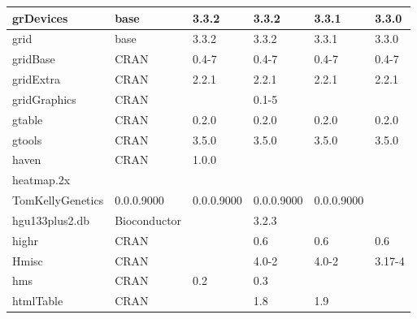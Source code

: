 \begin{longtable}{|llllll|}
grDevices                     & base                      & 3.3.2       & 3.3.2       & 3.3.1          & 3.3.0             \\ \hline \rowcolor{gray!25}
grid                          & base                      & 3.3.2       & 3.3.2       & 3.3.1          & 3.3.0            \\ \hline
gridBase                      & CRAN                      & 0.4-7       & 0.4-7       & 0.4-7          & 0.4-7             \\ \hline \rowcolor{gray!25}
gridExtra                     & CRAN                      & 2.2.1       & 2.2.1       & 2.2.1          & 2.2.1            \\ \hline
gridGraphics                  & CRAN                      &             & 0.1-5       &                &                   \\ \hline \rowcolor{gray!25}
gtable                        & CRAN                      & 0.2.0       & 0.2.0       & 0.2.0          & 0.2.0            \\ \hline
gtools                        & CRAN                      & 3.5.0       & 3.5.0       & 3.5.0          & 3.5.0             \\ \hline \rowcolor{gray!25}
haven                         & CRAN                      & 1.0.0       &             &                &                  \\ \hline
heatmap.2x                    & \begin{tabular}[c]{@{}l@{}}GitHub \\ TomKellyGenetics \end{tabular}  & 0.0.0.9000  & 0.0.0.9000  & 0.0.0.9000     & 0.0.0.9000        \\ \hline \rowcolor{gray!25}
hgu133plus2.db                & Bioconductor              &             & 3.2.3       &                &                  \\ \hline
highr                         & CRAN                      &             & 0.6         & 0.6            & 0.6               \\ \hline \rowcolor{gray!25}
Hmisc                         & CRAN                      &             & 4.0-2       & 4.0-2          & 3.17-4           \\ \hline
hms                           & CRAN                      & 0.2         & 0.3         &                &                   \\ \hline \rowcolor{gray!25}
htmlTable                     & CRAN                      &             & 1.8         & 1.9            &                  \\ \hline

\end{longtable}
